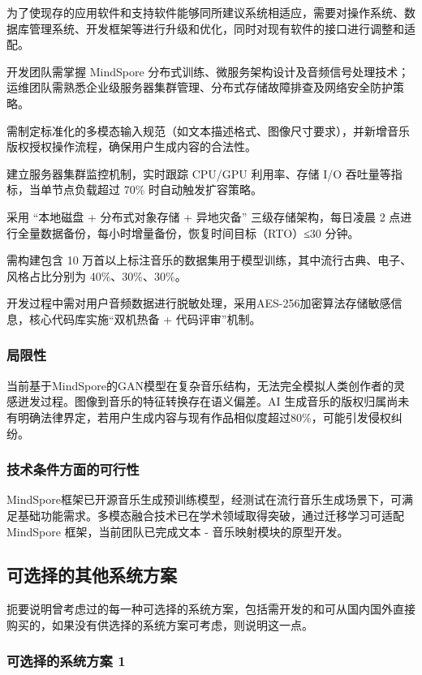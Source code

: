 \documentclass{base}
\numberwithin{figure}{section} %
\begin{document}
为了使现存的应用软件和支持软件能够同所建议系统相适应，需要对操作系统、数据库管理系统、开发框架等进行升级和优化，同时对现有软件的接口进行调整和适配。

开发团队需掌握 MindSpore 分布式训练、微服务架构设计及音频信号处理技术；运维团队需熟悉企业级服务器集群管理、分布式存储故障排查及网络安全防护策略。

需制定标准化的多模态输入规范（如文本描述格式、图像尺寸要求），并新增音乐版权授权操作流程，确保用户生成内容的合法性。

建立服务器集群监控机制，实时跟踪 CPU/GPU 利用率、存储 I/O 吞吐量等指标，当单节点负载超过 70\% 时自动触发扩容策略。  

采用 “本地磁盘 + 分布式对象存储 + 异地灾备” 三级存储架构，每日凌晨 2 点进行全量数据备份，每小时增量备份，恢复时间目标（RTO）≤30 分钟。

需构建包含 10 万首以上标注音乐的数据集用于模型训练，其中流行古典、电子、风格占比分别为 40\%、30\%、30\%。

开发过程中需对用户音频数据进行脱敏处理，采用AES-256加密算法存储敏感信息，核心代码库实施“双机热备 + 代码评审”机制。

\subsubsection{局限性}

当前基于MindSpore的GAN模型在复杂音乐结构，无法完全模拟人类创作者的灵感迸发过程。图像到音乐的特征转换存在语义偏差。AI 生成音乐的版权归属尚未有明确法律界定，若用户生成内容与现有作品相似度超过80\%，可能引发侵权纠纷。

\subsubsection{技术条件方面的可行性}

MindSpore框架已开源音乐生成预训练模型，经测试在流行音乐生成场景下，可满足基础功能需求。多模态融合技术已在学术领域取得突破，通过迁移学习可适配 MindSpore 框架，当前团队已完成文本 - 音乐映射模块的原型开发。

\subsection{可选择的其他系统方案}

扼要说明曾考虑过的每一种可选择的系统方案，包括需开发的和可从国内国外直接购买的，如果没有供选择的系统方案可考虑，则说明这一点。

\subsubsection{可选择的系统方案 1}
\end{document}
